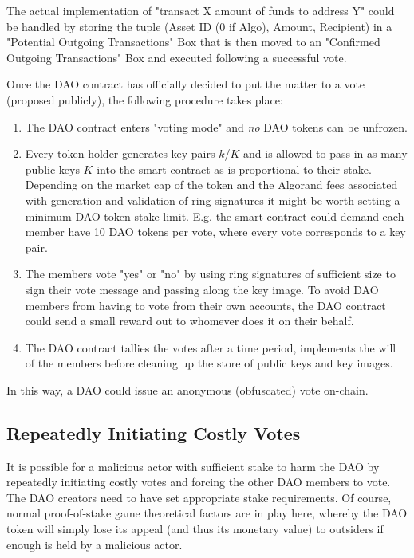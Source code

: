 \documentclass[9pt]{article}
\begin{document}
The actual implementation of "transact X amount of funds to address Y" could be handled by storing the tuple (Asset ID (0 if Algo), Amount, Recipient) in a "Potential Outgoing Transactions" Box that is then moved to an "Confirmed Outgoing Transactions" Box and executed following a successful vote.

Once the DAO contract has officially decided to put the matter to a vote (proposed publicly), the following procedure takes place:

\begin{enumerate}
    \item The DAO contract enters "voting mode" and \textit{no} DAO tokens can be unfrozen.
    \item Every token holder generates key pairs $k$/$K$ and is allowed to pass in as many public keys $K$ into the smart contract as is proportional to their stake. Depending on the market cap of the token and the Algorand fees associated with generation and validation of ring signatures it might be worth setting a minimum DAO token stake limit. E.g. the smart contract could demand each member have 10 DAO tokens per vote, where every vote corresponds to a key pair.
    \item The members vote "yes" or "no" by using ring signatures of sufficient size to sign their vote message and passing along the key image. To avoid DAO members from having to vote from their own accounts, the DAO contract could send a small reward out to whomever does it on their behalf.
    \item The DAO contract tallies the votes after a time period, implements the will of the members before cleaning up the store of public keys and key images.
\end{enumerate}

In this way, a DAO could issue an anonymous (obfuscated) vote on-chain.

\subsection{Repeatedly Initiating Costly Votes}

It is possible for a malicious actor with sufficient stake to harm the DAO by repeatedly initiating costly votes and forcing the other DAO members to vote. The DAO creators need to have set appropriate stake requirements. Of course, normal proof-of-stake game theoretical factors are in play here, whereby the DAO token will simply lose its appeal (and thus its monetary value) to outsiders if enough is held by a malicious actor. 
\end{document}
